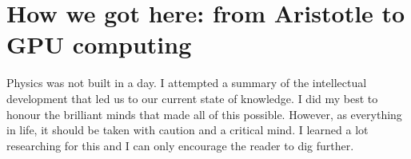 
%
%
%



\newpage

\chapter{How we got here: from Aristotle to GPU computing}



Physics was not built in a day. I attempted a summary of the intellectual development that led us to our current state of knowledge. I did my best to honour the brilliant minds that made all of this possible. However, as everything in life, it should be taken with caution and a critical mind. I learned a lot researching for this and I can only encourage the reader to dig further.

